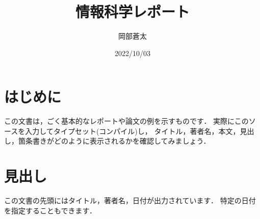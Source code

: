 \documentclass[a4paper, 11pt, uplatex]{jsarticle}
\begin{document}
\title{情報科学レポート}
\author{岡部蒼太}
\date{2022/10/03}
\maketitle


\section{はじめに}
この文書は，ごく基本的なレポートや論文の例を示すものです．
実際にこのソースを入力してタイプセット(コンパイル)し，
タイトル，著者名，本文，見出し，箇条書きがどのように表示されるかを確認してみましょう．

\section{見出し}
この文書の先頭にはタイトル，著者名，日付が出力されています．
特定の日付を指定することもできます．
\end{document}
